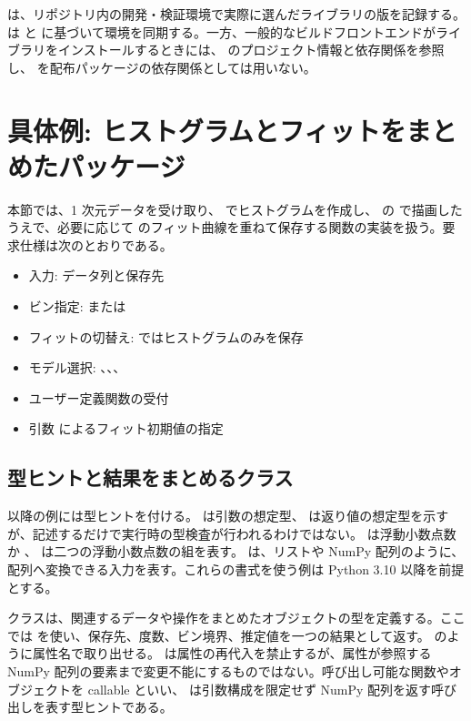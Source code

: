  は、リポジトリ内の開発・検証環境で実際に選んだライブラリの版を記録する。 は  と  に基づいて環境を同期する。一方、一般的なビルドフロントエンドがライブラリをインストールするときには、 のプロジェクト情報と依存関係を参照し、 を配布パッケージの依存関係としては用いない。

\section{具体例: ヒストグラムとフィットをまとめたパッケージ}

本節では、1 次元データを受け取り、 でヒストグラムを作成し、 の  で描画したうえで、必要に応じて  のフィット曲線を重ねて保存する関数の実装を扱う。要求仕様は次のとおりである。

\begin{itemize}
\item 入力: データ列と保存先
\item ビン指定:  または 
\item フィットの切替え:  ではヒストグラムのみを保存
\item モデル選択: 、、、
\item ユーザー定義関数の受付
\item 引数  によるフィット初期値の指定
\end{itemize}

\subsection{型ヒントと結果をまとめるクラス}
以降の例には型ヒントを付ける。 は引数の想定型、 は返り値の想定型を示すが、記述するだけで実行時の型検査が行われるわけではない。 は浮動小数点数か 、 は二つの浮動小数点数の組を表す。 は、リストや NumPy 配列のように、配列へ変換できる入力を表す。これらの書式を使う例は Python 3.10 以降を前提とする。

クラスは、関連するデータや操作をまとめたオブジェクトの型を定義する。ここでは  を使い、保存先、度数、ビン境界、推定値を一つの結果として返す。 のように属性名で取り出せる。 は属性の再代入を禁止するが、属性が参照する NumPy 配列の要素まで変更不能にするものではない。呼び出し可能な関数やオブジェクトを callable といい、 は引数構成を限定せず NumPy 配列を返す呼び出しを表す型ヒントである。

